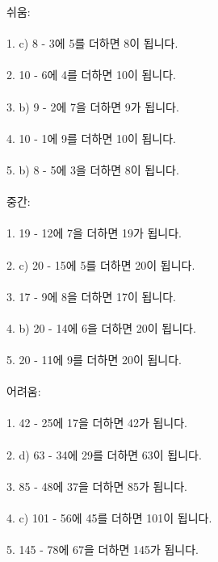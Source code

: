 \documentclass[fleqn]{article}
\begin{document}
      
        

 쉬움: \\\\
1. c) 8 - 3에 5를 더하면 8이 됩니다. \\\\
2. 10 - 6에 4를 더하면 10이 됩니다. \\\\
3. b) 9 - 2에 7을 더하면 9가 됩니다. \\\\
4. 10 - 1에 9를 더하면 10이 됩니다. \\\\
5. b) 8 - 5에 3을 더하면 8이 됩니다. \\\\

 중간: \\\\
1. 19 - 12에 7을 더하면 19가 됩니다. \\\\
2. c) 20 - 15에 5를 더하면 20이 됩니다. \\\\
3. 17 - 9에 8을 더하면 17이 됩니다. \\\\
4. b) 20 - 14에 6을 더하면 20이 됩니다. \\\\
5. 20 - 11에 9를 더하면 20이 됩니다. \\\\

 어려움: \\\\
1. 42 - 25에 17을 더하면 42가 됩니다. \\\\
2. d) 63 - 34에 29를 더하면 63이 됩니다. \\\\
3. 85 - 48에 37을 더하면 85가 됩니다. \\\\
4. c) 101 - 56에 45를 더하면 101이 됩니다. \\\\
5. 145 - 78에 67을 더하면 145가 됩니다. \\\\      
        
\end{document}
